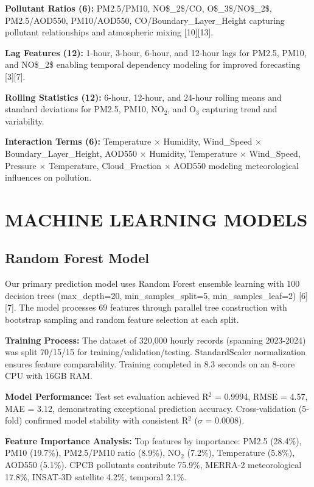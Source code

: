 \documentclass[10pt,twocolumn]{article}
\begin{document}
\textbf{Pollutant Ratios (6):} PM2.5/PM10, NO\$_2\$/CO, O\$_3\$/NO\$_2\$, PM2.5/AOD550, PM10/AOD550, CO/Boundary\_Layer\_Height capturing pollutant relationships and atmospheric mixing [10][13].

\textbf{Lag Features (12):} 1-hour, 3-hour, 6-hour, and 12-hour lags for PM2.5, PM10, and NO\$_2\$ enabling temporal dependency modeling for improved forecasting [3][7].

\textbf{Rolling Statistics (12):} 6-hour, 12-hour, and 24-hour rolling means and standard deviations for PM2.5, PM10, NO$_2$, and O$_3$ capturing trend and variability.

\textbf{Interaction Terms (6):} Temperature $\times$ Humidity, Wind\_Speed $\times$ Boundary\_Layer\_Height, AOD550 $\times$ Humidity, Temperature $\times$ Wind\_Speed, Pressure $\times$ Temperature, Cloud\_Fraction $\times$ AOD550 modeling meteorological influences on pollution.

\section{MACHINE LEARNING MODELS}

\subsection{Random Forest Model}

Our primary prediction model uses Random Forest ensemble learning with 100 decision trees (max\_depth=20, min\_samples\_split=5, min\_samples\_leaf=2) [6][7]. The model processes 69 features through parallel tree construction with bootstrap sampling and random feature selection at each split.

\textbf{Training Process:} The dataset of 320,000 hourly records (spanning 2023-2024) was split 70/15/15 for training/validation/testing. StandardScaler normalization ensures feature comparability. Training completed in 8.3 seconds on an 8-core CPU with 16GB RAM.

\textbf{Model Performance:} Test set evaluation achieved R$^2$ = 0.9994, RMSE = 4.57, MAE = 3.12, demonstrating exceptional prediction accuracy. Cross-validation (5-fold) confirmed model stability with consistent R$^2$ ($\sigma$ = 0.0008).

\textbf{Feature Importance Analysis:} Top features by importance: PM2.5 (28.4\%), PM10 (19.7\%), PM2.5/PM10 ratio (8.9\%), NO$_2$ (7.2\%), Temperature (5.8\%), AOD550 (5.1\%). CPCB pollutants contribute 75.9\%, MERRA-2 meteorological 17.8\%, INSAT-3D satellite 4.2\%, temporal 2.1\%.
\end{document}
